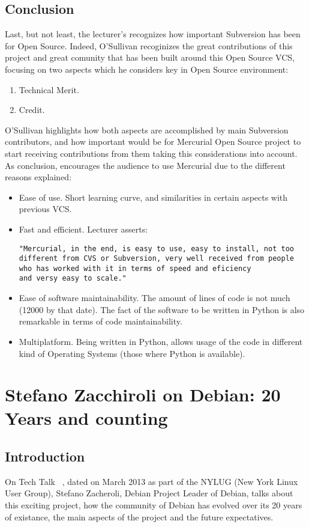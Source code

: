 \documentclass[11pt]{article}
\begin{document}
\subsection{Conclusion}
Last, but not least, the lecturer's recognizes how important Subversion has been for Open Source. Indeed, O'Sullivan recoginizes the great contributions of this project and great comunity that has been built around this Open Source VCS, focusing on two aspects which he considers key in Open Source environment:
\begin{enumerate}
\item{Technical Merit}.
\item{Credit}.
\end{enumerate}
O'Sullivan highlights how both aspects are accomplished by main Subversion contributors, and how important would be for Mercurial Open Source project to start receiving contributions from them taking this considerations into account.
As conclusion, encourages the audience to use Mercurial due to the different reasons explained:
\begin{itemize}\itemsep0pt
\item{Ease of use}. Short learning curve, and similarities in certain aspects with previous VCS.
\item{Fast and efficient}. Lecturer asserts:
\begin{verbatim}
"Mercurial, in the end, is easy to use, easy to install, not too
different from CVS or Subversion, very well received from people
who has worked with it in terms of speed and eficiency
and versy easy to scale."
\end{verbatim}
\item{Ease of software maintainability}. The amount of lines of code is not much (12000 by that date). The fact of the software to be written in Python is also remarkable in terms of code maintainability.
\item{Multiplatform}. Being written in Python, allows usage of the code in different kind of Operating Systems (those where Python is available).
\end{itemize}

\pagebreak

\section{Stefano Zacchiroli on Debian: 20 Years and counting}
\label{sec:debian20years}
\subsection{Introduction}
On Tech Talk ~\cite{TALK06}, dated on March 2013 as part of the NYLUG (New York Linux User Group), Stefano Zacheroli, Debian Project Leader of Debian, talks about this exciting project, how the community of Debian has evolved over its 20 years of existance, the main aspects of the project and the future expectatives. 
\end{document}
